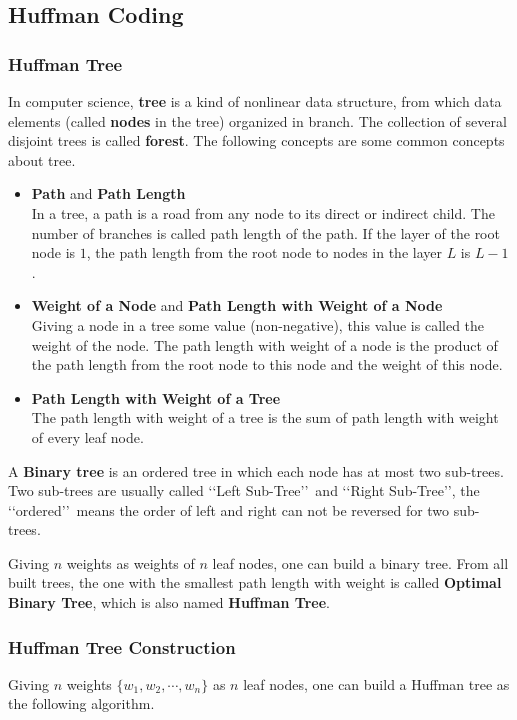 \subsection{Huffman Coding}

\subsubsection{Huffman Tree}
In computer science, \textbf{tree} is a kind of nonlinear data structure, from which data elements (called \textbf{nodes} in the tree) organized in branch. The collection of several disjoint trees is called \textbf{forest}. The following concepts are some common concepts about tree.
\begin{itemize}
\item \textbf{Path} and \textbf{Path Length}\\
In a tree, a path is a road from any node to its direct or indirect child. The number of branches is called path length of the path. If the layer of the root node is $1$, the path length from the root node to nodes in the layer $L$ is $L-1$.
\item \textbf{Weight of a Node} and \textbf{Path Length with Weight of a Node}\\
Giving a node in a tree some value (non-negative), this value is called the weight of the node. The path length with weight of a node is the product of the path length from the root node to this node and the weight of this node.
\item \textbf{Path Length with Weight of a Tree}\\
The path length with weight of a tree is the sum of path length with weight of every leaf node.
\end{itemize}

A \textbf{Binary tree} is an ordered tree in which each node has at most two sub-trees. Two sub-trees are usually called \lq\lq Left Sub-Tree\rq\rq\ and \lq\lq Right Sub-Tree\rq\rq , the \lq\lq ordered\rq\rq\ means the order of left and right can not be reversed for two sub-trees.

Giving $n$ weights as weights of $n$ leaf nodes, one can build a binary tree. From all built trees, the one with the smallest path length with weight is called \textbf{Optimal Binary Tree}, which is also named \textbf{Huffman Tree}.
\subsubsection{Huffman Tree Construction}
Giving $n$ weights $\{w_1,w_2,\cdots,w_n\}$ as $n$ leaf nodes, one can build a Huffman tree as the following algorithm.

